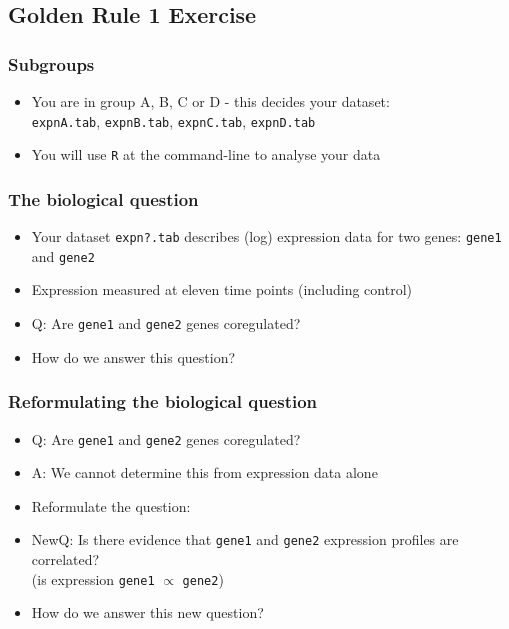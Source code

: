 %

\subsection{Golden Rule 1 Exercise}
\begin{frame}
  \frametitle{Subgroups}
  \begin{itemize}
    \item You are in group A, B, C or D - this decides your dataset: \\
             \texttt{expnA.tab}, \texttt{expnB.tab}, \texttt{expnC.tab}, \texttt{expnD.tab}
    \item You will use \texttt{R} at the command-line to analyse your data
  \end{itemize}
\end{frame}
  
\begin{frame}
  \frametitle{The biological question}
  \begin{itemize}
    \item Your dataset \texttt{expn?.tab} describes (log) expression data for two genes: \texttt{gene1} and \texttt{gene2}
    \item Expression measured at eleven time points (including control)
    \item Q: Are \texttt{gene1} and \texttt{gene2} genes coregulated?
    \item How do we answer this question?
  \end{itemize}
\end{frame}  

\begin{frame}
  \frametitle{Reformulating the biological question}
  \begin{itemize}
    \item<1-> Q: Are \texttt{gene1} and \texttt{gene2} genes coregulated?
    \item<1-> A: We cannot determine this from expression data alone
    \item<2-> Reformulate the question:
    \item<2-> NewQ: Is there evidence that \texttt{gene1} and \texttt{gene2} expression profiles are correlated? \\
                   (is expression \texttt{gene1} $\propto$ \texttt{gene2})
    \item<2-> How do we answer this new question?
  \end{itemize}
\end{frame}

